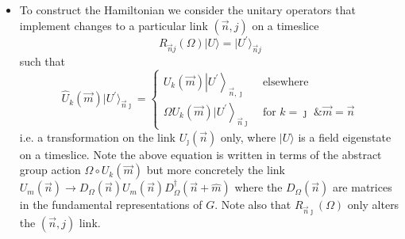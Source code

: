 \begin{itemize}
\begin{itemize}
      The kinetic operator can be written as $\hat{T}_K^\prime = \hat{T}_K \hat{P}_0 (=\hat{P}_0 \hat{T}_K)$ with
      \begin{equation}
          \langle U_{t+1}| \hat{T}_K | U_t \rangle = \prod_{\vec{n}} \prod_{m=1}^d \exp \left[\frac{2a}{g^2 a_t} \operatorname{Re}\operatorname{Tr}\{ U_m(\vec{n}, t)U^\dagger_m(\vec{n}, t+1)\} \right].
          \label{eq:TkME}
      \end{equation}
      Note that this is the form you would immediately get in temporal gauge. $\hat{T}_K$ is a positive operator and defines a Hermitian kinetic operator $\hat{T}_K = \exp\{-a_t \hat{K}\}$ and so the full transfer operator can be written as
      \begin{equation}
          \hat{T} = \hat{P}_0 e^{- a_t \hat{H}} = e^{-a_t \hat{H}}\hat{P}_0.
      \end{equation}
  \end{itemize}
  \item To construct the Hamiltonian we consider the unitary operators that implement changes to a particular link $(\vec{n},j)$ on a timeslice
  \begin{equation}
      R_{\vec{n} j}(\Omega)|U\rangle=\mid U^{\prime} \rangle_{\vec{n} {j}}
  \end{equation}
  such that
  \begin{equation}
      \hat{U}_k(\vec{m})|U^\prime\rangle_{\vec{n} \jmath} = \begin{cases}U_{k}(\vec{m})\left|U^{\prime}\right\rangle_{\vec{n}, \jmath} & \text { elsewhere } \\ \left.\Omega U_{k}(\vec{m}) | U^{\prime}\right\rangle_{\vec{n} \jmath} & \text { for } k=\jmath \text { \& } \vec{m}=\vec{n}\end{cases}
  \end{equation}
  i.e. a transformation on the link $U_\jmath(\vec{n})$ only, where $|U\rangle$ is a field eigenstate on a timeslice.
    Note the above equation is written in terms of the abstract group action $\Omega\circ U_k(\vec{m})$ but more concretely the link $U_m(\vec{n})\to D_\Omega(\vec n) U_m(\vec{n}) D_\Omega^\dagger(\vec n+ \hat m)$ where the $D_\Omega(\vec n)$ are matrices in the fundamental representations of $G$. Note also that $R_{\vec{n} \jmath}(\Omega)$ only alters the $(\vec n,j)$ link.


\end{itemize}
